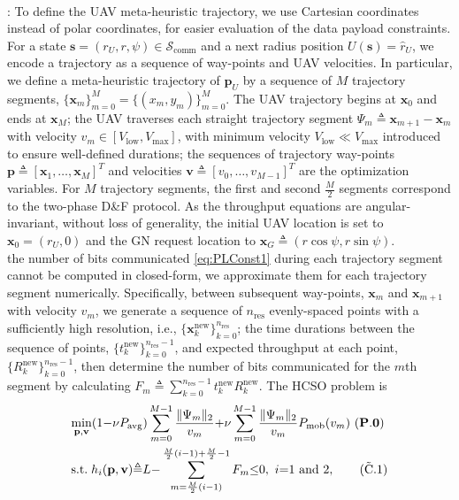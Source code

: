 \documentclass[10pt, twocolumn]{IEEEtran}
\theoremstyle{plain}
\theoremstyle{definition}
\theoremstyle{remark}
\begin{document}
\\: To define the UAV meta-heuristic trajectory, we use Cartesian coordinates instead of polar coordinates, for easier evaluation of the data payload constraints. For a state $\mathbf{s}{=}(r_{U},r,\psi){\in}\mathcal{S}_{\mathrm{comm}}$ and a next radius position $U(\mathbf{s}){=}\hat{r}_{U}$, we encode a trajectory as a sequence of way-points and UAV velocities. In particular, we define a meta-heuristic trajectory of $\mathbf{p}_{U}$ by a sequence of $M$ trajectory segments, $\{\mathbf{x}_{m}\}_{m{=}0}^{M}{=}\{(x_{m},y_{m})\}_{m{=}0}^{M}$. The UAV trajectory begins at $\mathbf{x}_{0}$ and ends at $\mathbf{x}_{M}$; the UAV traverses each straight trajectory segment $\Psi_{m}{\triangleq}\mathbf{x}_{m{+}1}{-}\mathbf{x}_{m}$ with velocity $v_{m}{\in}[V_{\mathrm{low}},V_{\mathrm{max}}]$, with minimum velocity $V_{\mathrm{low}}{\ll}V_{\mathrm{max}}$ introduced to ensure well-defined durations; the sequences of trajectory way-points $\mathbf{p}{\triangleq}[\mathbf{x}_{1},{\dots},\mathbf{x}_{M}]^{T}$ and velocities $\mathbf{v}{\triangleq}[v_{0},{\dots},v_{M{-}1}]^{T}$ are the optimization variables. For $M$ trajectory segments, the first and second $\frac{M}{2}$ segments correspond to the two-phase D\&F protocol. As the throughput equations are angular-invariant, without loss of generality, the initial UAV location is set to $\mathbf{x}_{0}{=}(r_{U},0)$ and the GN request location to $\mathbf{x}_G{\triangleq}(r\cos{\psi},r\sin{\psi})$.\\
 the number of bits communicated \eqref{eq:PLConst1} during each trajectory segment cannot be computed in closed-form, we approximate them for each trajectory segment numerically. Specifically, between subsequent way-points, $\mathbf{x}_{m}$ and $\mathbf{x}_{m{+}1}$ with velocity $v_{m}$, we generate a sequence of $n_{\mathrm{res}}$ evenly-spaced points with a sufficiently high resolution, i.e., $\{\mathbf{x}_{k}^{\mathrm{new}}\}_{k{=}0}^{n_{\mathrm{res}}}$; the time durations between the sequence of points, $\{t_{k}^{\mathrm{new}}\}_{k{=}0}^{n_{\mathrm{res}}{-}1}$, and expected throughput at each point, $\{R_{k}^{\mathrm{new}}\}_{k{=}0}^{n_{\mathrm{res}}{-}1}$, then determine the number of bits communicated for the $m$th segment by calculating $F_{m}{\triangleq}\sum_{k{=}0}^{n_{\mathrm{res}}{-}1}t_{k}^{\mathrm{new}}R_{k}^{\mathrm{new}}$. The HCSO problem is
\begin{align}
    &\underset{\mathbf{p},\mathbf{v}}{\mathrm{min}}(1{-}\nu P_{\mathrm{avg}})\sum_{m{=}0}^{M{-}1}\frac{\Vert\Psi_{m}\Vert_{2}}{v_{m}}{+}\nu\sum_{m{=}0}^{M{-}1}\frac{\Vert\Psi_{m}\Vert_{2}}{v_{m}}P_{\mathrm{mob}}(v_{m})\ (\mathbf{P.0})\nonumber\\
    &\mathrm{s.t.}\; h_{i}(\mathbf{p},\mathbf{v}){\triangleq}L{-}\sum_{m{=}\frac{M}{2}(i{-}1)}^{\frac{M}{2}(i{-}1){+}\frac{M}{2}{-}1}F_{m}{\leq}0,\ i{=}1\text{ and }2,\label{eq:NewPLC}\tag{$\tilde{\text{C}}$.1}
\end{align}
\end{document}
